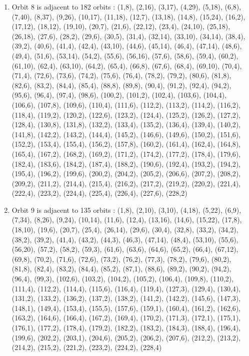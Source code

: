 \documentclass[12pt]{article}
\begin{document}
\begin{enumerate}
\item Orbit 8 is adjacent to 182 orbits : (1,8), (2,16), (3,17), (4,29), (5,18), (6,8), (7,40), (8,37), (9,26), (10,17), (11,18), (12,7), (13,18), (14,8), (15,24), (16,2), (17,12), (18,12), (19,10), (20,7), (21,6), (22,12), (23,4), (24,10), (25,18), (26,18), (27,6), (28,2), (29,6), (30,5), (31,4), (32,14), (33,10), (34,14), (38,4), (39,2), (40,6), (41,4), (42,4), (43,10), (44,6), (45,14), (46,4), (47,14), (48,6), (49,4), (51,6), (53,14), (54,2), (55,6), (56,16), (57,6), (58,6), (59,4), (60,2), (61,10), (62,4), (63,10), (64,2), (65,4), (66,8), (67,6), (68,4), (69,10), (70,4), (71,4), (72,6), (73,6), (74,2), (75,6), (76,4), (78,2), (79,2), (80,6), (81,8), (82,6), (83,2), (84,4), (85,4), (88,8), (89,8), (90,4), (91,2), (92,4), (94,2), (95,6), (96,4), (97,4), (98,6), (100,2), (101,2), (102,4), (103,6), (104,4), (106,6), (107,8), (109,6), (110,4), (111,6), (112,2), (113,2), (114,2), (116,2), (118,4), (119,2), (120,2), (122,6), (123,2), (124,4), (125,2), (126,2), (127,2), (128,4), (130,8), (131,8), (132,2), (133,4), (135,2), (136,4), (139,4), (140,2), (141,8), (142,2), (143,2), (144,4), (145,2), (146,6), (149,6), (150,2), (151,6), (152,2), (153,4), (155,4), (156,2), (157,8), (160,2), (161,4), (162,4), (164,8), (165,4), (167,2), (168,2), (169,2), (171,2), (174,2), (177,2), (178,4), (179,6), (182,4), (183,6), (184,2), (187,4), (188,2), (190,6), (192,4), (193,2), (194,2), (195,4), (196,2), (199,6), (200,2), (204,2), (205,2), (206,6), (207,2), (208,2), (209,2), (211,2), (214,4), (215,4), (216,2), (217,2), (219,2), (220,2), (221,4), (222,4), (223,2), (224,4), (225,4), (226,4), (227,6), (228,2)
\item Orbit 9 is adjacent to 135 orbits : (1,8), (2,10), (3,10), (4,18), (5,22), (6,9), (7,34), (8,26), (9,24), (10,14), (11,6), (12,4), (13,16), (14,6), (15,22), (17,8), (18,10), (19,6), (20,7), (25,4), (26,14), (29,6), (30,4), (32,8), (33,2), (34,2), (38,2), (39,2), (41,4), (43,2), (44,3), (46,3), (47,14), (48,4), (53,10), (55,6), (56,20), (57,2), (58,2), (59,3), (61,6), (63,6), (64,6), (65,2), (66,4), (67,12), (69,8), (70,2), (71,6), (72,6), (73,2), (76,2), (77,3), (78,2), (79,6), (80,2), (81,8), (82,4), (83,2), (84,4), (85,2), (87,1), (88,6), (89,2), (90,2), (94,2), (96,4), (99,3), (102,6), (103,2), (104,2), (105,2), (106,4), (109,8), (110,2), (111,4), (112,2), (114,4), (115,6), (116,4), (119,4), (127,3), (129,4), (130,4), (131,2), (133,2), (136,2), (137,2), (138,2), (141,2), (142,2), (145,6), (147,3), (148,1), (149,4), (153,4), (155,5), (157,6), (159,1), (160,4), (161,2), (162,6), (163,2), (164,6), (166,4), (167,2), (169,4), (170,2), (171,3), (172,1), (175,1), (176,1), (177,2), (178,4), (179,2), (182,2), (183,2), (184,3), (188,4), (196,4), (199,6), (202,2), (203,1), (204,6), (205,2), (206,2), (207,6), (212,2), (213,2), (214,2), (215,2), (221,2), (223,2), (224,2), (228,4)

\end{enumerate}
\end{document}
